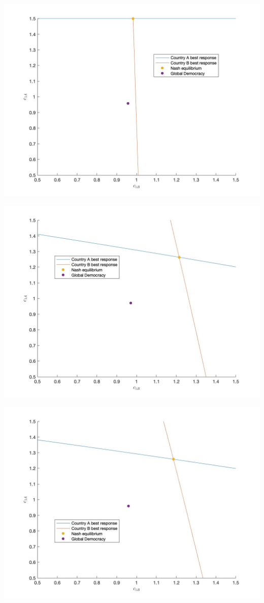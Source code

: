 \documentclass[11pt,preprint, authoryear]{elsarticle}
\let\origfigure\figure
\let\endorigfigure\endfigure
\renewenvironment{figure}[1][2] {
    \expandafter\origfigure\expandafter[H]
} {
    \endorigfigure
}
\numberwithin{equation}{section}
\numberwithin{figure}{section}
\numberwithin{table}{section}
\begin{document}
\newpage

\begin{figure}[H]

{\centering \includegraphics[width=0.45\linewidth]{images/Fig2_0.1Size0Bias} 

}

\caption{Nash equilibrium for 0.1 country A share}\label{fig:unnamed-chunk-2}
\end{figure}

\begin{figure}[H]

{\centering \includegraphics[width=0.45\linewidth]{images/Fig2_0.5Size0Bias} 

}

\caption{Nash equilibrium for 50/50 country split}\label{fig:unnamed-chunk-3}
\end{figure}

\begin{figure}[H]

{\centering \includegraphics[width=0.45\linewidth]{images/Fig2_0.5Size0.9Bias} 

}

\caption{Nash equilibrium for 0.9 bias for country A}\label{fig:unnamed-chunk-4}
\end{figure}
\end{document}
